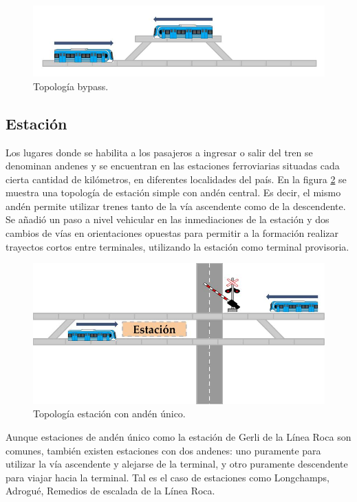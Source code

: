 		\begin{figure}[h]
		\centering
			\includegraphics[scale=.45]{./Figures/Bypass_2}
			\caption{Topología bypass.}
			\label{fig:Bypass_2}
		\end{figure}

	\vspace{5cm}
				
	\subsection{Estación}

		Los lugares donde se habilita a los pasajeros a ingresar o salir del tren se denominan andenes y se encuentran en las estaciones ferroviarias situadas cada cierta cantidad de kilómetros, en diferentes localidades del país. En la figura \ref{fig:Estacion} se muestra una topología de estación simple con andén central. Es decir, el mismo andén permite utilizar trenes tanto de la vía ascendente como de la descendente. Se añadió un paso a nivel vehicular en las inmediaciones de la estación y dos cambios de vías en orientaciones opuestas para permitir a la formación realizar trayectos cortos entre terminales, utilizando la estación como terminal provisoria.
		
			\begin{figure}[h]
			\centering
				\includegraphics[scale=.45]{./Figures/Estacion}
				\caption{Topología estación con andén único.}
				\label{fig:Estacion}
			\end{figure}
		
		Aunque estaciones de andén único como la estación de Gerli de la Línea Roca son comunes, también existen estaciones con dos andenes: uno puramente para utilizar la vía ascendente y alejarse de la terminal, y otro puramente descendente para viajar hacia la terminal. Tal es el caso de estaciones como Longchamps, Adrogué, Remedios de escalada de la Línea Roca.

